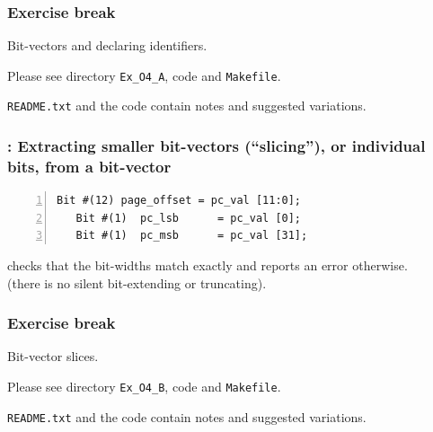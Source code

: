 
\begin{frame}
\frametitle{\EmojiExercise \hmm Exercise break}

Bit-vectors and declaring identifiers.

\vspace{2ex}

Please see directory {\tt Ex\_O4\_A}, code and {\tt Makefile}.

\vspace*{5ex}

{\tt README.txt} and the code contain notes and suggested variations.

\end{frame}


\begin{frame}[fragile]
\frametitle{{\BSV}: Extracting smaller bit-vectors (``slicing''), or individual bits, from a bit-vector}

\footnotesize

\begin{Verbatim}[frame=single, numbers=left]
   Bit #(12) page_offset = pc_val [11:0];
   Bit #(1)  pc_lsb      = pc_val [0];
   Bit #(1)  pc_msb      = pc_val [31];
\end{Verbatim}

\vspace{1ex}

{\bsc} checks that the bit-widths match exactly and reports an error otherwise. \\
(there is no silent bit-extending or truncating).

\end{frame}


\begin{frame}
\frametitle{\EmojiExercise \hmm Exercise break}

Bit-vector slices.

\vspace{2ex}

Please see directory {\tt Ex\_O4\_B}, code and {\tt Makefile}.

\vspace*{5ex}

{\tt README.txt} and the code contain notes and suggested variations.

\end{frame}

